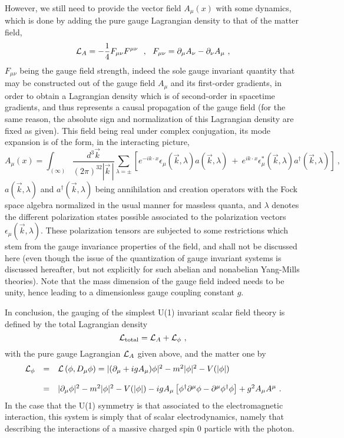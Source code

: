 \documentclass[a4paper,11pt]{article}
\begin{document}
However, we still need to provide the vector field $A_\mu(x)$ with some
dynamics, which is done by adding the pure gauge Lagrangian density to
that of the matter field,
\begin{equation}
{\cal L}_A=-\frac{1}{4}F_{\mu\nu}F^{\mu\nu}\ \ ,\ \ 
F_{\mu\nu}=\partial_\mu A_\nu-\partial_\nu A_\mu\ ,
\end{equation}
$F_{\mu\nu}$ being the gauge field strength, indeed the sole gauge 
invariant quantity that may be constructed out of the gauge field $A_\mu$ and
its first-order gradients, in order to obtain a Lagrangian density
which is of second-order in spacetime gradients, and thus represents
a causal propagation of the gauge field (for the same reason, the absolute 
sign and normalization of this Lagrangian density are fixed as given). 
This field being real under complex conjugation, its mode expansion is of 
the form, in the interacting picture,
\begin{equation}
A_\mu(x)=\int_{(\infty)}\frac{d^3\vec{k}}{(2\pi)^32|\vec{k}\,|}
\sum_{\lambda=\pm}
\left[e^{-ik\cdot x}\epsilon_\mu(\vec{k},\lambda)a(\vec{k},\lambda)\ +\ 
e^{ik\cdot x}\epsilon^*_\mu(\vec{k},\lambda)a^\dagger(\vec{k},\lambda)\right]
\ ,
\end{equation}
$a(\vec{k},\lambda)$ and $a^\dagger(\vec{k},\lambda)$ being annihilation
and creation operators with the Fock space algebra normalized in the
usual manner for massless quanta, and $\lambda$ denotes the different
polarization states possible associated to the polarization vectors
$\epsilon_\mu(\vec{k},\lambda)$. These polarization tensors are subjected
to some restrictions which stem from the gauge invariance properties of
the field, and shall not be discussed here (even though the issue of the
quantization of gauge invariant systems is discussed hereafter, but
not explicitly for such abelian and nonabelian Yang-Mills theories).
Note that the mass dimension of the gauge field indeed needs to be unity,
hence leading to a dimensionless gauge coupling constant $g$.

In conclusion, the gauging of the simplest U(1) invariant scalar field
theory is defined by the total Lagrangian density
\begin{equation}
{\cal L}_{\rm total}={\cal L}_A+{\cal L}_\phi\ ,
\end{equation}
with the pure gauge Lagrangian ${\cal L}_A$ given above, and
the matter one by
\begin{equation}
\begin{array}{r c l}
{\cal L}_\phi&=&{\cal L}\left(\phi,D_\mu\phi\right)=
|(\partial_\mu+igA_\mu)\phi|^2-m^2|\phi|^2-V(|\phi|)\\
 & & \\
 &=&|\partial_\mu\phi|^2-m^2|\phi|^2-V(|\phi|)
-igA_\mu\left[\phi^\dagger\partial^\mu\phi-\partial^\mu\phi^\dagger\phi\right]
+g^2A_\mu A^\mu\ .
\end{array}
\end{equation}
In the case that the U(1) symmetry is that associated to the 
elec\-tro\-ma\-gne\-tic
interaction, this system is simply that of scalar electrodynamics, namely
that describing the interactions of a massive charged spin 0 particle 
with the photon.
\end{document}
